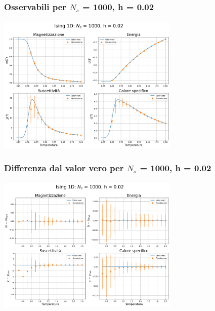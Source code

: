 \begin{frame}
    \frametitle{Osservabili per $N_s$ = 1000, h = 0.02}
    \framesubtitle{}

    \centering
    \includegraphics[width=0.65\textwidth]{Immagini/backupIsing1D/obs_1000_0.02.png}

\end{frame}



\begin{frame}
    \frametitle{Differenza dal valor vero per $N_s$ = 1000, h = 0.02}
    \framesubtitle{}

    \centering
    \includegraphics[width=0.65\textwidth]{Immagini/backupIsing1D/obs_1000_0.02_diff.png}

\end{frame}



